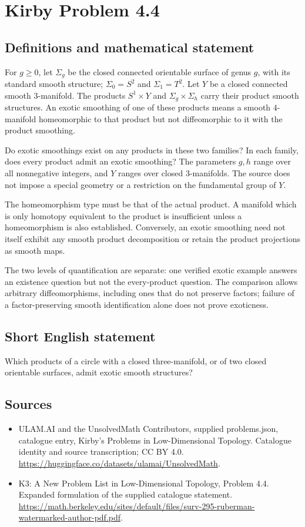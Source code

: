 \documentclass[11pt,a4paper]{article}
\begin{document}
\section*{Kirby Problem 4.4}\label{statement}

\subsection{Definitions and mathematical statement}
For $g\ge0$, let $\Sigma_g$ be the closed connected orientable surface
of genus $g$, with its standard smooth structure; $\Sigma_0=S^2$ and
$\Sigma_1=T^2$. Let $Y$ be a closed connected smooth $3$-manifold.
The products $S^1\times Y$ and $\Sigma_g\times\Sigma_h$ carry their
product smooth structures. An exotic smoothing of one of these products
means a smooth $4$-manifold homeomorphic to that product but not
diffeomorphic to it with the product smoothing.

Do exotic smoothings exist on any products in these two families?
In each family, does every product admit an exotic smoothing? The
parameters $g,h$ range over all nonnegative integers, and $Y$ ranges
over closed $3$-manifolds. The source does not impose a special geometry
or a restriction on the fundamental group of $Y$.

The homeomorphism type must be that of the actual product. A manifold
which is only homotopy equivalent to the product is insufficient unless
a homeomorphism is also established. Conversely, an exotic smoothing
need not itself exhibit any smooth product decomposition or retain
the product projections as smooth maps.

The two levels of quantification are separate: one verified exotic
example answers an existence question but not the every-product
question. The comparison allows arbitrary diffeomorphisms, including
ones that do not preserve factors; failure of a factor-preserving
smooth identification alone does not prove exoticness.
\subsection{Short English statement}
Which products of a circle with a closed three-manifold, or of two closed orientable surfaces, admit exotic smooth structures?
\subsection{Sources}
\begin{itemize}
\item[S1] ULAM.AI and the UnsolvedMath Contributors, supplied problems.json, catalogue entry, Kirby's Problems in Low-Dimensional Topology. Catalogue identity and source transcription; CC BY 4.0.
\url{https://huggingface.co/datasets/ulamai/UnsolvedMath}.
\item[S2] K3: A New Problem List in Low-Dimensional Topology, Problem 4.4. Expanded formulation of the supplied catalogue statement.
\url{https://math.berkeley.edu/sites/default/files/surv-295-ruberman-watermarked-author-pdf.pdf}.
\end{itemize}
\end{document}
